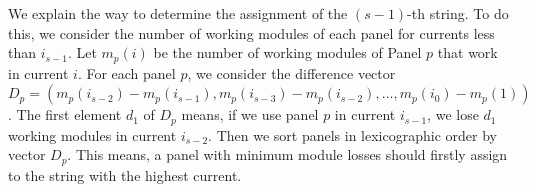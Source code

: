 \documentclass[conference]{IEEEtran}
\begin{document}
We explain the way to determine the assignment of the $(s-1)$-th string. To do this, we consider the number of working modules of each panel for currents less than $i_{s-1}$. Let $m_p(i)$ be the number of working modules of Panel $p$ that work in current $i$. For each panel $p$, we consider the difference vector $D_p=(m_p(i_{s-2})-m_p(i_{s-1}), m_p(i_{s-3})-m_p(i_{s-2}), \ldots, m_p(i_0)-m_p(1))$. The first element $d_1$ of $D_p$ means, if we use panel $p$ in current $i_{s-1}$, we lose $d_1$ working modules in current $i_{s-2}$. Then we sort panels in lexicographic order by vector $D_p$. This means, a panel with minimum module losses should firstly assign to the string with the highest current.
\end{document}
